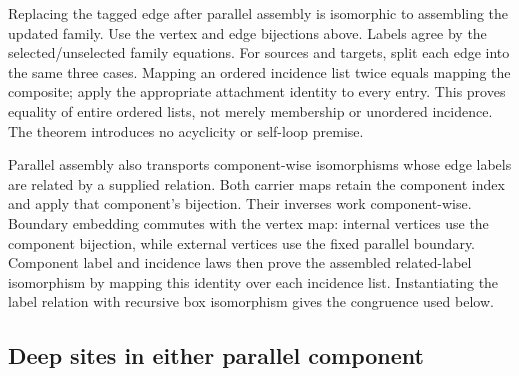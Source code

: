 





Replacing the tagged edge after parallel assembly is isomorphic to assembling
the updated family. Use the vertex and edge bijections above. Labels agree by
the selected/unselected family equations. For sources and targets, split each
edge into the same three cases. Mapping an ordered incidence list twice equals
mapping the composite; apply the appropriate attachment identity to every
entry. This proves equality of entire ordered lists, not merely membership or
unordered incidence. The theorem introduces no acyclicity or self-loop premise.



Parallel assembly also transports component-wise isomorphisms whose edge
labels are related by a supplied relation. Both carrier maps retain the
component index and apply that component's bijection. Their inverses work
component-wise. Boundary embedding commutes with the vertex map: internal
vertices use the component bijection, while external vertices use the fixed
parallel boundary. Component label and incidence laws then prove the assembled
related-label isomorphism by mapping this identity over each incidence list.
Instantiating the label relation with recursive box isomorphism gives the
congruence used below.






\subsection{Deep sites in either parallel component}

